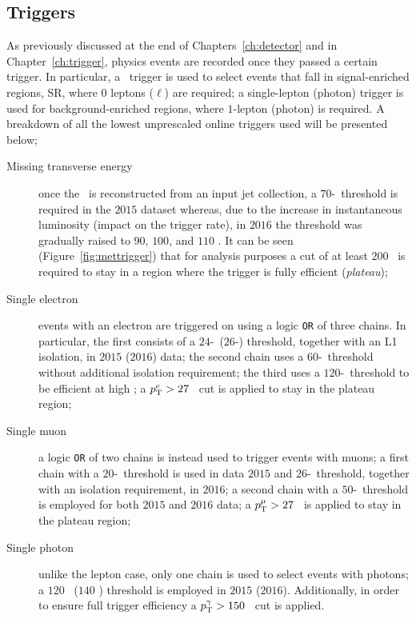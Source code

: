 		\subsection*{Triggers}

			As previously discussed at the end of Chapters~\ref{ch:detector} and in Chapter~\ref{ch:trigger}, physics events are recorded once they passed a certain trigger. In particular, a \met\ trigger is used to select events that fall in signal-enriched regions, \ac{SR}, where $0$ leptons ($\ell$) are required; a single-lepton (photon) trigger is used for background-enriched regions, where $1$-lepton (photon) is required. A breakdown of all the lowest unprescaled online triggers used will be presented below;

			\begin{description}
				\item [Missing transverse energy] once the \met\ is reconstructed from an input jet collection, a $70$-\GeV\ threshold is required in the $2015$ dataset whereas, due to the increase in instantaneous luminosity (impact on the trigger rate), in $2016$ the threshold was gradually raised to $90$, $100$, and $110$ \GeV. It can be seen (Figure~\ref{fig:mettrigger}) that for analysis purposes a cut of at least $200$ \GeV\ is required to stay in a region where the trigger is fully efficient (\emph{plateau}); 

				\item [Single electron] events with an electron are triggered on using a logic \texttt{OR} of three chains. In particular, the first consists of a $24$-\GeV\ ($26$-\GeV) threshold, together with an \ac{L1} isolation, in $2015$ ($2016$) data; the second chain uses a $60$-\GeV\ threshold without additional isolation requirement; the third uses a $120$-\GeV\ threshold to be efficient at high \et; a $p_{\mathrm{T}}^e > 27$ \GeV\ cut is applied to stay in the plateau region;

				\item [Single muon] a logic \texttt{OR} of two chains is instead used to trigger events with muons; a first chain with a $20$-\GeV\ threshold is used in data $2015$ and $26$-\GeV\ threshold, together with an isolation requirement, in $2016$; a second chain with a $50$-\GeV\ threshold is employed for both $2015$ and $2016$ data; a $p_{\mathrm{T}}^\mu > 27$ \GeV\ is applied to stay in the plateau region;

				\item [Single photon] unlike the lepton case, only one chain is used to select events with photons; a $120$ \GeV\ ($140$ \GeV) threshold is employed in $2015$ ($2016$). Additionally, in order to ensure full trigger efficiency a $p_{\mathrm{T}}^\gamma > 150$ \GeV\ cut is applied.
			\end{description}


